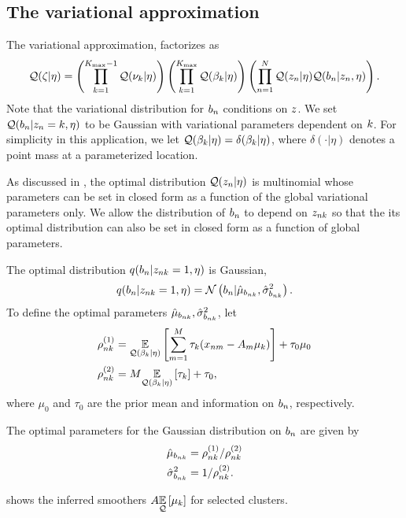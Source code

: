 \subsection{The variational approximation}
The variational approximation, factorizes as
\begin{align*}
\q(\zeta \vert \eta) =
    \left( \prod_{\k=1}^{\kmax - 1} \q(\nuk \vert \eta) \right)
    \left( \prod_{\k=1}^{\kmax} \q(\beta_\k \vert \eta) \right)
    \left( \prod_{\n=1}^{\N} \q(\z_{\n} \vert \eta)
    \q(\b_{\n} \vert \z_{\n}, \eta)\right).
\end{align*}
Note that the variational distribution for $b_n$ conditions on $z$.
We set $\mathcal{Q}(b_{n} \vert z_{n} = k, \eta)$ to be Gaussian
with variational parameters dependent on $k$.
For simplicity in this application,
we let $\mathcal{Q}(\beta_k \vert \eta) = \delta (\beta_k \vert \eta)$,
where $\delta(\cdot \vert \eta)$ denotes a point mass at a parameterized location.

As discussed in ,
the optimal distribution $\mathcal{Q}(z_n\vert\eta)$ is multinomial whose parameters
can be set in closed form as a function of the global variational parameters only.
We allow the distribution of $b_n$ to depend on $z_{nk}$ so that
the its optimal distribution can also be set in closed form as a function of
global parameters.

The optimal distribution $q(b_n\vert z_{nk} = 1, \eta)$ is Gaussian,
\begin{align*}
q(\b_\n\vert \z_{\n\k} = 1, \eta) = \normdist{\b_\n \vert \hat\mu_{\b_{\n\k}}, \hat\sigma^2_{\b_{\n\k}}}.
\end{align*}
To define the optimal parameters $\hat\mu_{b_{nk}}, \hat\sigma^2_{b_{nk}}$, let
\begin{align*}
  \rho^{(1)}_{\n\k} &= \expect{\q(\beta_k|\eta)}{\sum_{m=1}^\ntimepoints \tau_{k}(x_{nm} - \regmatrix_m\mu_\k)} +
  \tau_0 \mu_0 \\
  \rho^{(2)}_{\n\k} &= \ntimepoints \expect{\q(\beta_k|\eta)}{\tau_{k}} + \tau_0,
\end{align*}
where $\mu_0$ and $\tau_0$ are the prior mean and information on $b_n$, respectively.

The optimal parameters for the Gaussian distribution on $b_n$ are given by
\begin{align*}
  \hat\mu_{\b_{\n\k}} &= \rho^{(1)}_{\n\k} / \rho^{(2)}_{\n\k}\\
  \hat\sigma^2_{\b_{\n\k}} &= 1 / \rho^{(2)}_{\n\k}.
\end{align*}

 shows the inferred smoothers
$A \underset{\mathcal{Q}}{\mathbb{E}}\left[\mu_k\right]$ for selected clusters.
\MiceSmoothers

